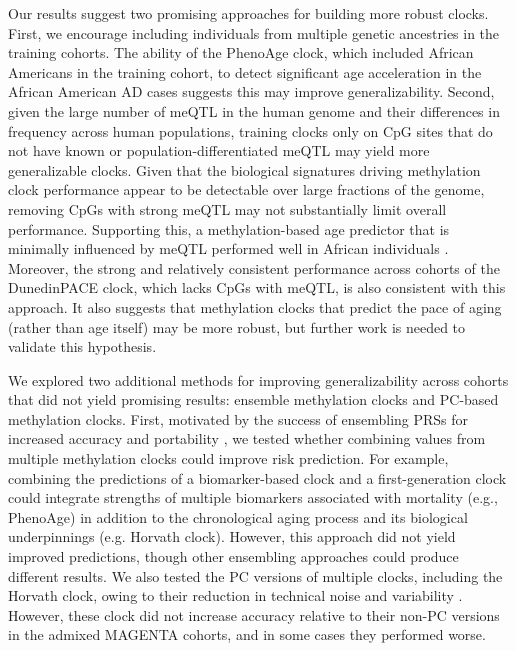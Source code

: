 Our results suggest two promising approaches for building more robust clocks. First, we encourage including individuals from multiple genetic ancestries in the training cohorts. The ability of the PhenoAge clock, which included African Americans in the training cohort, to detect significant age acceleration in the African American AD cases suggests this may improve generalizability. Second, given the large number of meQTL in the human genome and their differences in frequency across human populations, training clocks only on CpG sites that do not have known or population-differentiated meQTL may yield more generalizable clocks. Given that the biological signatures driving methylation clock performance appear to be detectable over large fractions of the genome, removing CpGs with strong meQTL may not substantially limit overall performance. Supporting this, a methylation-based age predictor that is minimally influenced by meQTL performed well in African individuals \citep{meeks_common_2025}. Moreover, the strong and relatively consistent performance across cohorts of the DunedinPACE clock, which lacks CpGs with meQTL, is also consistent with this approach. It also suggests that methylation clocks that predict the pace of aging (rather than age itself) may be more robust, but further work is needed to validate this hypothesis.  

We explored two additional methods for improving generalizability across cohorts that did not yield promising results: ensemble methylation clocks and PC-based methylation clocks. First, motivated by the success of ensembling PRSs for increased accuracy and portability \citep{truong_integrative_2024}, we tested whether combining values from multiple methylation clocks could improve risk prediction. For example, combining the predictions of a biomarker-based clock and a first-generation clock could integrate strengths of multiple biomarkers associated with mortality (e.g., PhenoAge) in addition to the chronological aging process and its biological underpinnings (e.g. Horvath clock). However, this approach did not yield improved predictions, though other ensembling approaches could produce different results. We also tested the PC versions of multiple clocks, including the Horvath clock, owing to their reduction in technical noise and variability \citep{higgins-chen_computational_2022}. However, these clock did not increase accuracy relative to their non-PC versions in the admixed MAGENTA cohorts, and in some cases they performed worse. %

